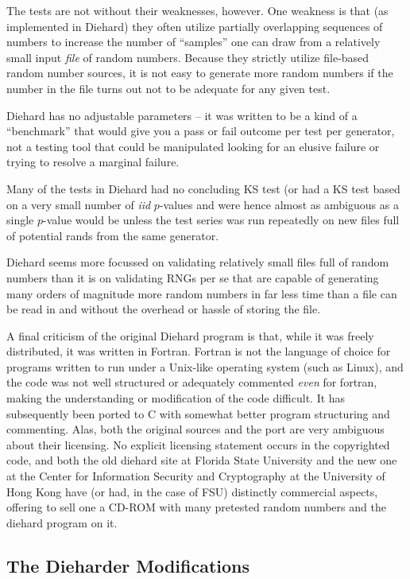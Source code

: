 \documentclass[12pt]{article}
\begin{document}
The tests are not without their weaknesses, however.  One weakness is
that (as implemented in Diehard) they often utilize partially overlapping
sequences of numbers to increase the number of ``samples'' one can draw
from a relatively small input {\em file} of random numbers.  Because
they strictly utilize file-based random number sources, it is not easy
to generate more random numbers if the number in the file turns out not
to be adequate for any given test.  

Diehard has no adjustable parameters -- it was written to be a kind of a
``benchmark'' that would give you a pass or fail outcome per test per
generator, not a testing tool that could be manipulated looking for an
elusive failure or trying to resolve a marginal failure.

Many of the tests in Diehard had no concluding KS test (or had a KS test
based on a very small number of {\em iid} $p$-values and were hence
almost as ambiguous as a single $p$-value would be unless the test
series was run repeatedly on new files full of potential rands from the
same generator.  

Diehard seems more focussed on validating relatively small files full of
random numbers than it is on validating RNGs per se that are capable of
generating many orders of magnitude more random numbers in far less time
than a file can be read in and without the overhead or hassle of storing
the file.

A final criticism of the original Diehard program is that, while it was
freely distributed, it was written in Fortran.  Fortran is not the
language of choice for programs written to run under a Unix-like
operating system (such as Linux), and the code was not well structured
or adequately commented {\em even} for fortran, making the understanding
or modification of the code difficult.  It has subsequently been ported
to C\cite{hkproj} with somewhat better program structuring and
commenting.  Alas, both the original sources and the port are very
ambiguous about their licensing.  No explicit licensing statement occurs
in the copyrighted code, and both the old diehard site at Florida State
University and the new one at the Center for Information Security and
Cryptography at the University of Hong Kong have (or had, in the case of
FSU) distinctly commercial aspects, offering to sell one a CD-ROM with
many pretested random numbers and the diehard program on it.

\subsection{The Dieharder Modifications}
\end{document}
